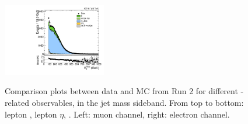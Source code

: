\begin{figure}[htbp]
  \includegraphics[width=0.4\textwidth]{fig/controlPlots/SB_b1_e_allP_allC_allD_Run2_met_pt.pdf}\\
  \caption{
    Comparison plots between data and MC from Run 2 for different \Wlep-related observables, in the jet mass sideband.
    From top to bottom: lepton \pt, lepton $\eta$, \Etmiss.
    Left: muon channel, right: electron channel.
  }
  \label{fig:SB_controlPlotsRun2_1}
\end{figure}

